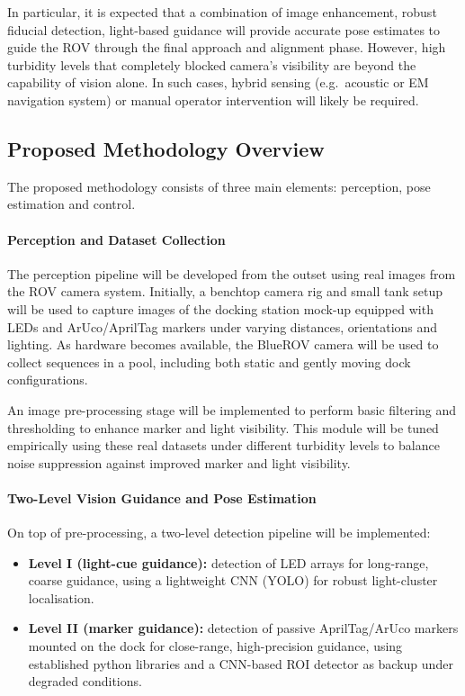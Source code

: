 In particular, it is expected that a combination of image enhancement, robust fiducial detection, light-based guidance  will provide accurate pose estimates to guide the ROV through the final approach and alignment phase. However, high turbidity levels that completely blocked camera's visibility are  beyond the capability of vision alone. In such cases, hybrid sensing (e.g.\ acoustic or EM navigation system) or manual operator intervention will likely be required.

\subsection{Proposed Methodology Overview}

The proposed methodology consists of three main elements: perception, pose estimation and control.

\paragraph{Perception and Dataset Collection}

The perception pipeline will be developed from the outset using real images from the ROV camera system. Initially, a benchtop camera rig and small tank setup will be used to capture images of the docking station mock-up equipped with LEDs and ArUco/AprilTag markers under varying distances, orientations and lighting. As hardware becomes available, the BlueROV camera will be used to collect sequences in a pool, including both static and gently moving dock configurations.

An image pre-processing stage will be implemented to perform basic filtering and thresholding to enhance marker and light visibility. This module will be tuned empirically using these real datasets under different turbidity levels to balance noise suppression against improved marker and light visibility.

\paragraph{Two-Level Vision Guidance and Pose Estimation}

On top of pre-processing, a two-level detection pipeline will be implemented:

\begin{itemize}
    \item \textbf{Level I (light-cue guidance):} detection of LED arrays for long-range, coarse guidance, using a lightweight CNN (YOLO) for robust light-cluster localisation.
    \item \textbf{Level II (marker guidance):} detection of passive AprilTag/ArUco markers mounted on the dock for close-range, high-precision guidance, using established python libraries and a CNN-based ROI detector as backup under degraded conditions.
\end{itemize}

